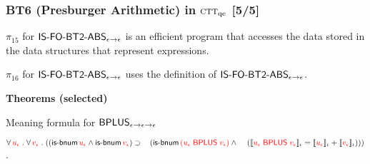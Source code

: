 \documentclass[t,12pt,numbers,fleqn]{beamer}
\newcommand{\churchqe}{$\mbox{\sc ctt}_{\rm qe}$}
\newcommand{\syn}[1]{\textcolor{red}{#1}}
\begin{document}

\begin{frame}
\frametitle{BT6 (Presburger Arithmetic) in {\churchqe} [5/5]}
\small
\vspace{-2ex}
\bi

  \item[]

  \be

    \setcounter{enumi}{14}

    \item $\pi_{15}$ for $\mbox{\sf IS-FO-BT2-ABS}_{\epsilon \rightarrow
      \epsilon}$ is an efficient program that accesses the data stored
      in the data structures that represent expressions.

    \item $\pi_{16}$ for $\mbox{\sf IS-FO-BT2-ABS}_{\epsilon \rightarrow
      \epsilon}$ uses the definition of
      $\mbox{\sf IS-FO-BT2-ABS}_{\epsilon \rightarrow \epsilon}$.

  \ee

  \item[] \textbf{Theorems (selected)}

    \be

      \setcounter{enumi}{2}

      \item Meaning formula for 
      $\mbox{\sf BPLUS}_{\epsilon \rightarrow \epsilon \rightarrow \epsilon}$

      $\ForallApp \syn{u_\epsilon} \mdot \ForallApp \syn{v_\epsilon} \mdot
      ((\mname{is-bnum} \, \syn{u_\epsilon} \Andd \mname{is-bnum} \, \syn{v_\epsilon}) 
      \Implies {}\newline
      \hspace*{2ex}(\mname{is-bnum} \, 
      \syn{(u_\epsilon \; \mname{BPLUS} \; v_\epsilon)} \Andd {}\newline
      \hspace*{2.6ex}(\sembrack{\syn{u_\epsilon \; \mname{BPLUS} \; 
      v_\epsilon}}_\iota = 
      \sembrack{\syn{u_\epsilon}}_\iota + \sembrack{\syn{v_\epsilon}}_\iota)))$.

    \ee

\ei
\end{frame}

\end{document}

